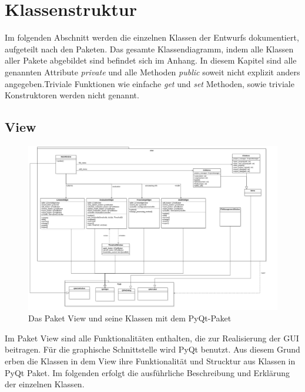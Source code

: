 \documentclass{article}
\begin{document}
\newpage
\section{Klassenstruktur}
Im folgenden Abschnitt werden die einzelnen Klassen der Entwurfs dokumentiert, aufgeteilt nach den Paketen. Das gesamte Klassendiagramm, indem alle Klassen aller Pakete abgebildet sind befindet sich im Anhang. In diesem Kapitel sind alle genannten Attribute \textit{private} und alle Methoden \textit{public} soweit nicht explizit anders angegeben.Triviale Funktionen wie einfache \textit{get} und \textit{set} Methoden, sowie triviale Konstruktoren werden nicht genannt.

\subsection{View}
\begin{figure}[H]%
    \centering
    \includegraphics[width=15cm]{entwurf/Entwurf_dokument/img/Alissa/View.png}
    \caption{Das Paket View und seine Klassen mit dem PyQt-Paket}
\end{figure}
Im Paket View sind alle Funktionalitäten enthalten, die zur Realisierung der GUI beitragen. Für die graphische Schnittstelle wird PyQt benutzt. Aus diesem Grund erben die Klassen in dem View ihre Funktionalität und Strucktur aus Klassen in PyQt Paket. Im folgenden erfolgt die ausführliche Beschreibung und Erklärung der einzelnen Klassen.
\end{document}
